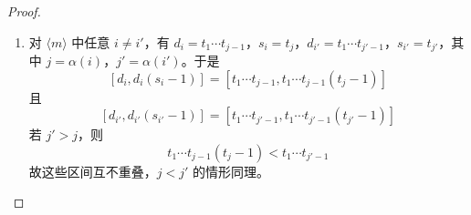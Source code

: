 \begin{proof}
\begin{enumerate}
\begin{itemize}
            \item (c) 与 (d)：同样，由于 $T'$ 加细 $T$，存在某个 $1 \leq b \leq n'$ 使得
            \[
            s_id_i = t_1 \cdots t_j = t_1' \cdots t_b' = u_1' \cdots u_b'.
            \]
            取极大的 $\ell \in \langle p \rangle $ 使得 $u_1 \cdots u_{\ell - 1} \leq u_1' \cdots u_b'$。
            \begin{itemize}
                \item 设 $\ell < p$。我们观察到
                \[
                u_1 \cdots u_{\ell-1} \leq s_i d_i < u_1 \cdots u_{\ell}.
                \]
                其中第二个不等式由 $\ell \in \langle p \rangle$ 的极大性得出。引理 \ref{prefixproductdivisibilitylemma} 蕴含 $u_1 \cdots u{\ell-1}$ 整除 $ s_id_i$，且 $s_id_i$ 真整除 $u_1 \cdots u_{\ell}$。
                \item 设 $\ell = p$。我们观察到
                \[
                u_1 \cdots u_{\ell-1} \leq s_id_i = t_1 \cdots t_{j} \leq t_1 \cdots t_n \leq u_1 \cdots u_{p} = u_1 \cdots u_k.
                \]
                引理 \ref{prefixproductdivisibilitylemma} 蕴含 $u_1 \cdots u_{k-1}$ 整除 $ d_i$，且 $d_i$ 整除 $u_1 \cdots u_{k}$。
            \end{itemize}
        \end{itemize}
        \item 对 $\langle m \rangle$ 中任意 $i \neq i'$，有 $d_i = t_1 \cdots t_{j-1}$，$s_i = t_j$，$d_{i'} = t_1 \cdots t_{j'-1}$，$s_{i'} = t_{j'}$，其中 $j = \alpha(i)$，$j' = \alpha(i')$。于是
        \[
        [d_i, d_i(s_i-1)] = [t_1 \cdots t_{j-1} , t_1 \cdots t_{j-1}(t_j - 1)]
        \]
        且
        \[
        [d_{i'}, d_{i'}(s_{i'}-1)] = [t_1 \cdots t_{{j'}-1} , t_1 \cdots t_{{j'}-1}(t_{j'} - 1)]
        \]
        若 $j' > j$，则
        \[
        t_1 \cdots t_{j-1}(t_j - 1) < t_1 \cdots t_{{j'}-1}
        \]
        故这些区间互不重叠，$j < j'$ 的情形同理。
    \end{enumerate}
\end{proof}
